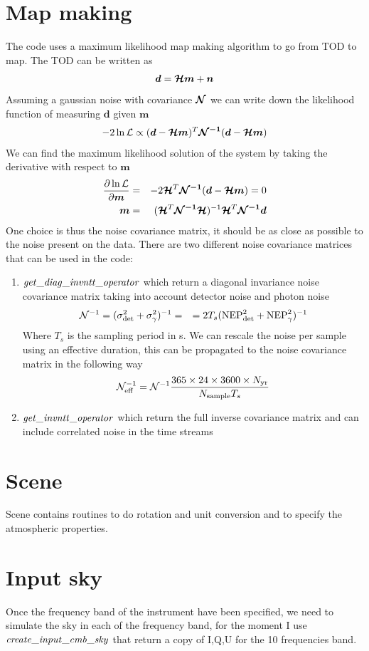 \documentclass[a4paper, 11pt]{article}
\def\ba{\begin{eqnarray}}
\def\ea{\end{eqnarray}}
\begin{document}
\section{Map making}

The code uses a maximum likelihood map making algorithm to go from TOD to map.
The TOD can be written as
\ba
\bm {d}=  \bm {{\cal H} m }+ \bm {n}
\ea
Assuming a gaussian noise with covariance $\bm{{\cal N}}$ we can write down the likelihood function of measuring $\bm{d}$ given $\bm{m}$
\ba
-2 \ln {\cal L} \propto ( \bm{d}- \bm {{\cal H} m })^{T} \bm{{\cal N}^{-1}}  (\bm{d}- \bm {{\cal H} m })
\ea
We can find the maximum likelihood solution of the system by taking the derivative with respect to $\bm{m}$
\ba
\frac{ \partial \ln {\cal L}}{ \partial \bm{m}} &=& -2  \bm {{\cal H} }^{T} \bm{{\cal N}^{-1}}  (\bm{d}- \bm {{\cal H }m  }) =0 \\
\bm {m}&=& ( \bm {{\cal H} }^{T} \bm{{\cal N}^{-1}} \bm {{\cal H }  })^{-1}    \bm {{\cal H} }^{T} \bm{{\cal N}^{-1}} \bm{d}
\ea
One choice is thus the noise covariance matrix, it should be as close as possible to the noise present on the data. There are two different noise covariance matrices that can be used in the code:

\begin{enumerate}
\item
${\it get\_diag\_invntt\_operator}$ which return a diagonal invariance noise covariance matrix taking into account detector noise and photon noise
\ba
{\cal N}^{-1}= (\sigma^{2}_{\rm det} + \sigma^{2}_{\gamma})^{-1} 
&=& = 2 T_{s} ({\rm NEP}^{2}_{\rm det} + {\rm NEP}^{2}_{\gamma})^{-1} 
\ea
Where $T_{s}$ is the sampling period in s.
We can rescale the noise per sample using an effective duration, this can be propagated to the noise covariance matrix in the following way
\ba
{\cal N}_{\rm eff}^{-1}=  {\cal N}^{-1}  \frac{ 365 \times 24 \times3600 \times N_{\rm yr} }{ N_{\rm sample} T_{s}}
\ea
\item
${\it get\_invntt\_operator}$ which return the full inverse covariance matrix and can include correlated noise in the time streams

\end{enumerate}


\section{Scene}

 Scene contains  routines to do rotation and  unit conversion  and to specify  the atmospheric properties.


\section{Input sky}

Once the frequency band of the instrument have been specified, we need to simulate the sky in each of the frequency band, for the moment I use $\it{create\_input\_cmb\_sky}$ that return a copy of I,Q,U for the 10 frequencies band.
\end{document}

